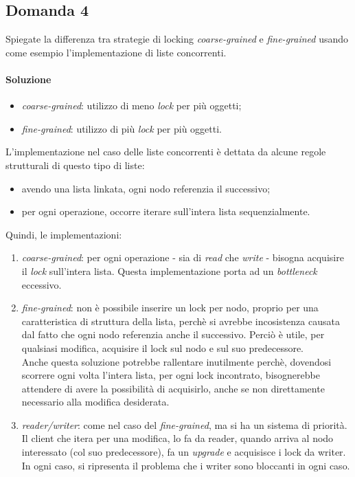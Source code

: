 \newpage

\subsection{Domanda 4}
Spiegate la differenza tra strategie di locking \textit{coarse-grained} e \textit{fine-grained} usando come esempio l'implementazione di liste concorrenti.
\paragraph{Soluzione}
\begin{itemize}
	\item \textit{coarse-grained}: utilizzo di meno \textit{lock} per pi\`u oggetti;
	\item \textit{fine-grained}: utilizzo di pi\`u \textit{lock} per pi\`u oggetti.
\end{itemize}
L'implementazione nel caso delle liste concorrenti \`e dettata da alcune regole strutturali di questo tipo di liste:
\begin{itemize}
	\item avendo una lista linkata, ogni nodo referenzia il successivo;
	\item per ogni operazione, occorre iterare sull'intera lista sequenzialmente.
\end{itemize}
Quindi, le implementazioni:
\begin{enumerate}
	\item \textit{coarse-grained}: per ogni operazione - sia di \textit{read} che \textit{write} - bisogna acquisire il \textit{lock} sull'intera lista. Questa implementazione porta ad un \textit{bottleneck} eccessivo.
	\item \textit{fine-grained}: non \`e possibile inserire un lock per nodo, proprio per una caratteristica di struttura della lista, perch\`e si avrebbe incosistenza causata dal fatto che ogni nodo referenzia anche il successivo. Perci\`o è utile, per qualsiasi modifica, acquisire il lock sul nodo e sul suo predecessore. \\
	Anche questa soluzione potrebbe rallentare inutilmente perch\`e, dovendosi scorrere ogni volta l'intera lista, per ogni lock incontrato, bisognerebbe attendere di avere la possibilit\`a di acquisirlo, anche se non direttamente necessario alla modifica desiderata.
	\item \textit{reader/writer}: come nel caso del \textit{fine-grained}, ma si ha un sistema di priorit\`a. Il client che itera per una modifica, lo fa da reader, quando arriva al nodo interessato (col suo predecessore), fa un \textit{upgrade} e acquisisce i lock da writer. In ogni caso, si ripresenta il problema che i writer sono bloccanti in ogni caso.
\end{enumerate}

